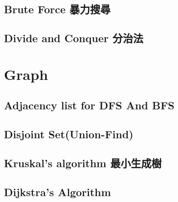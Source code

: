 %

\subsection{Brute Force 暴力搜尋}


\subsection{Divide and Conquer 分治法}







\section{Graph}

\subsection{Adjacency list for DFS And BFS}


\subsection{Disjoint Set(Union-Find)}


\subsection{Kruskal’s algorithm 最小生成樹}


\subsection{Dijkstra’s Algorithm}


%

%

